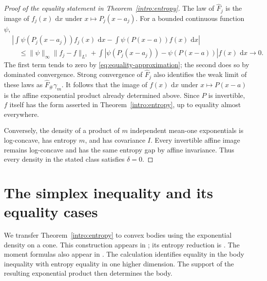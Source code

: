 \documentclass[11pt]{article}
\theoremstyle{definition}
\theoremstyle{remark}
\numberwithin{equation}{section}
\begin{document}
\begin{proof}[Proof of the equality statement in Theorem~\ref{intro:entropy}]
The law of $\widehat F_j$ is the image of $f_j(x)\,\,\mathrm d x$ under
$x\mapsto P_j(x-a_j)$.  For a bounded continuous function $\psi$,
\begin{align*}
 &\left|\int\psi(P_j(x-a_j))f_j(x)\,\,\mathrm d x
       -\int\psi(P(x-a))f(x)\,\,\mathrm d x\right|\\
 &\quad\le\lVert \psi\rVert_{\infty}\lVert f_j-f\rVert_{L^1}
     +\int\left|\psi(P_j(x-a_j))-\psi(P(x-a))\right|f(x)\,\,\mathrm d x
     \longrightarrow0.
\end{align*}
The first term tends to zero by \eqref{eq:equality-approximation};
the second does so by dominated convergence.  Strong convergence of
$\widehat F_j$ also identifies the weak limit of these laws as
$\widehat F_\#\gamma_m$.  It follows that the image of $f(x)\,\,\mathrm d x$
under $x\mapsto P(x-a)$ is the affine exponential product already
determined above.  Since $P$ is invertible, $f$ itself has the form
asserted in Theorem~\ref{intro:entropy}, up to equality almost everywhere.

Conversely, the density of a product of $m$ independent mean-one
exponentials is log-concave, has entropy $m$, and has covariance $I$.
Every invertible affine image remains log-concave and has the same
entropy gap by affine invariance.  Thus every density in the stated
class satisfies $\delta=0$.
\end{proof}

\section{The simplex inequality and its equality cases}\label{sec:geometry}

We transfer Theorem~\ref{intro:entropy} to convex bodies using the exponential
density on a cone. This construction appears in
\cite[Proposition~2(b)]{FradeliziMeyer2008}; its entropy reduction is
\cite[Lemma~5.2 and Proposition~5.2]{FradeliziMarinSola2026}.
The moment formulas also appear in \cite[Lemma~2.5]{Klartag2018}.
The calculation identifies equality in the body inequality with entropy
equality in one higher dimension.  The support of the resulting
exponential product then determines the body.
\end{document}
